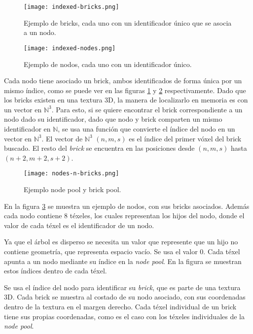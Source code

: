 \begin{figure}[h!]
    \centering
    \texttt{[image: indexed-bricks.png]}
    \caption{Ejemplo de bricks, cada uno con un identificador único que se asocia a un nodo.}
    \label{fig:indexed_bricks}
\end{figure}

\begin{figure}[h!]
    \centering
    \texttt{[image: indexed-nodes.png]}
    \caption{Ejemplo de nodos, cada uno con un identificador único.}
    \label{fig:indexed_nodes}
\end{figure}

Cada nodo tiene asociado un brick, ambos identificados de forma única por un mismo índice, como se puede ver en las figuras \ref{fig:indexed_bricks} y \ref{fig:indexed_nodes} respectivamente.
Dado que los bricks existen en una textura 3D, la manera de localizarlo en memoria es con un vector en $\mathbb{N}^3$.
Para esto, si se quiere encontrar el brick correspondiente a un nodo dado su identificador, dado que nodo y brick comparten un mismo identificador en $\mathbb{N}$, se usa una función que convierte el índice del nodo en un vector en $\mathbb{N}^3$.
El vector de $\mathbb{N}^3$ $(n, m, s)$ es el índice del primer vóxel del brick buscado.
El resto del \textit{brick} se encuentra en las posiciones desde $(n, m, s)$ hasta $(n + 2, m + 2, s + 2)$.

\begin{figure}[h!]
    \centering
    \texttt{[image: nodes-n-bricks.png]}
    \caption{Ejemplo node pool y brick pool.}
    \label{fig:nodes_n_bricks}
\end{figure}

En la figura \ref{fig:nodes_n_bricks} se muestra un ejemplo de nodos, con sus bricks asociados.
Además cada nodo contiene $8$ téxeles, los cuales representan los hijos del nodo, donde el valor de cada téxel es el identificador de un nodo.

Ya que el árbol es disperso se necesita un valor que represente que un hijo no contiene geometría, que representa espacio vacío.
Se usa el valor 0.
Cada téxel apunta a un nodo mediante su índice en la \textit{node pool}.
En la figura se muestran estos índices dentro de cada téxel.

Se usa el índice del nodo para identificar su \textit{brick}, que es parte de una textura 3D.
Cada brick se muestra al costado de su nodo asociado, con sus coordenadas dentro de la textura en el margen derecho.
Cada téxel individual de un brick tiene sus propias coordenadas, como es el caso con los téxeles individuales de la \textit{node pool}.

